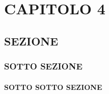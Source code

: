 \chapter{CAPITOLO 4} \label{Cap.4}
\vspace{2cm}

\begin{flushright}
    \textit{\lipsum[1][1-5]}
\end{flushright}

\vspace{0.5cm}



\lipsum[1-5]


\section{SEZIONE}
\lipsum[6]

\subsection{SOTTO SEZIONE}
\lipsum[7]

\subsubsection{SOTTO SOTTO SEZIONE}
\lipsum[8]

